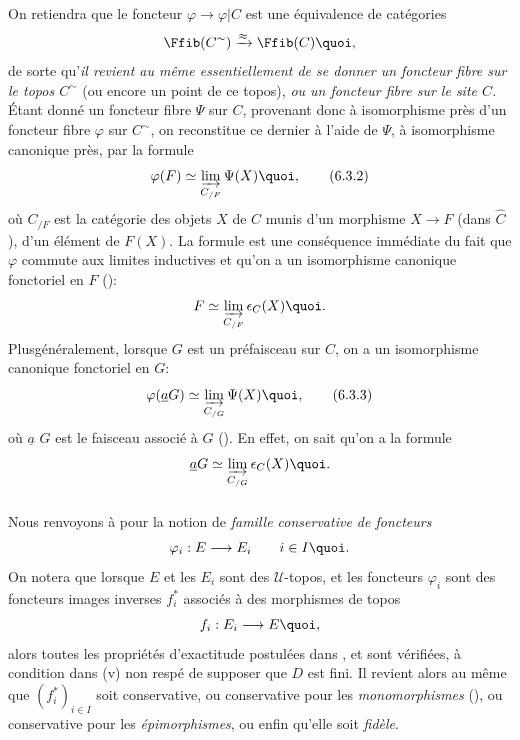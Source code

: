 \documentclass[10pt]{../fichiers-configuration-latex/smfart}
\begin{document}
On retiendra que le foncteur $\varphi\rightarrow \varphi| C$ est une
équivalence de catégories
$$
\Ffib(C^{\sim})\xrightarrow{\approx}\Ffib(C){\quoi},
$$
de sorte qu'\emph{il revient au même essentiellement de se donner un
foncteur fibre sur le topos $C^{\sim}$} (ou encore un point de ce
topos), \emph{ou un foncteur fibre sur le site $C$.} Étant donné un
foncteur fibre $\Psi$ sur $C$, provenant donc à isomorphisme près
d'un foncteur fibre $\varphi$ sur $C^{\sim}$, on reconstitue ce
dernier à l'aide de $\Psi$, à isomorphisme canonique près, par la
formule
\begin{equation*}
\varphi(F)\simeq \varinjlim_{C_{/F}}\Psi (X){\quoi},\tag{6.3.2}
\end{equation*}
où $C_{/F}$ est la catégorie des objets $X$ de $C$ munis d'un
morphisme $X\rightarrow F$ (dans $\widehat{C}$), \ie d'un élément de
$F(X)$. La formule  est une conséquence immédiate du
fait que $\varphi$ commute aux limites inductives et qu'on a un
isomorphisme canonique fonctoriel en $F$ ():
$$
F\simeq \varinjlim_{C_{/F}}\epsilon_C(X){\quoi}.
$$
Plus\pageoriginale généralement, lorsque $G$ est un préfaisceau sur
$C$, on a un isomorphisme canonique fonctoriel en $G$:
\begin{equation*}
\varphi(\underline{a}G)\simeq
\varinjlim_{C_{/G}}\Psi(X){\quoi},\tag{6.3.3}
\end{equation*}
où $\underline{a}$ $G$ est le faisceau associé à $G$
(). En effet, on sait qu'on a la formule
$$
\underline{a}G\simeq \varinjlim_{C_{/G}}\epsilon_C(X){\quoi}.
$$

\setcounter{subsection}{4} \setcounter{subsubsection}{-1}
\subsubsection{}
Nous renvoyons à  pour la notion de \emph{famille
conservative de foncteurs}
$$
\varphi_i:E\longrightarrow E_i\qquad i\in I{\quoi}.
$$
On notera que lorsque $E$ et les $E_i$ sont des $𝒰$-topos,
et les foncteurs $\varphi_i$ sont des foncteurs images inverses
$f^{\ast}_i$ associés à des morphismes de topos
$$
f_i:E_i\longrightarrow E{\quoi},
$$
alors toutes les propriétés d'exactitude postulées dans
,  et  sont vérifiées, à
condition dans  (v) non respé de supposer que $D$ est
fini. Il revient alors au même que $(f^{\ast}_i)_{i\in I}$ soit
conservative, ou conservative pour les \emph{monomorphismes}
(), ou conservative pour les \emph{épimorphismes}, ou
enfin qu'elle soit \emph{fidèle}.
\end{document}

